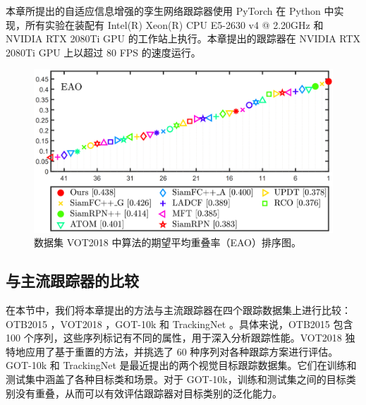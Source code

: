 本章所提出的自适应信息增强的孪生网络跟踪器使用 PyTorch 在 Python 中实现，所有实验在装配有 Intel(R) Xeon(R) CPU E5-2630 v4 @ 2.20GHz
和 NVIDIA RTX 2080Ti GPU 的工作站上执行。本章提出的跟踪器在 NVIDIA RTX 2080Ti GPU 上以超过 80 FPS 的速度运行。

\begin{figure}[t]
    \centering
    \includegraphics[width=1.0\textwidth]{Img/MTP/vot18/vot18_eao.png}
    \caption{数据集 VOT2018 中算法的期望平均重叠率（EAO）排序图。}
    \label{fig:eao}
\end{figure}


\subsection{与主流跟踪器的比较}

在本节中，我们将本章提出的方法与主流跟踪器在四个跟踪数据集上进行比较：OTB2015 \cite{OTB2015}，VOT2018 \cite{kristan2018sixth}，GOT-10k \cite{GOT-10k} 和 TrackingNet \cite{muller2018trackingnet}。具体来说，OTB2015 \cite{OTB2015} 包含 100 个序列，这些序列标记有不同的属性，用于深入分析跟踪性能。VOT2018 \cite{kristan2018sixth} 独特地应用了基于重置的方法，并挑选了 60 种序列对各种跟踪方案进行评估。GOT-10k \cite{GOT-10k} 和 TrackingNet \cite{muller2018trackingnet} 是最近提出的两个视觉目标跟踪数据集。它们在训练和测试集中涵盖了各种目标类和场景。对于 GOT-10k，训练和测试集之间的目标类别没有重叠，从而可以有效评估跟踪器对目标类别的泛化能力。

